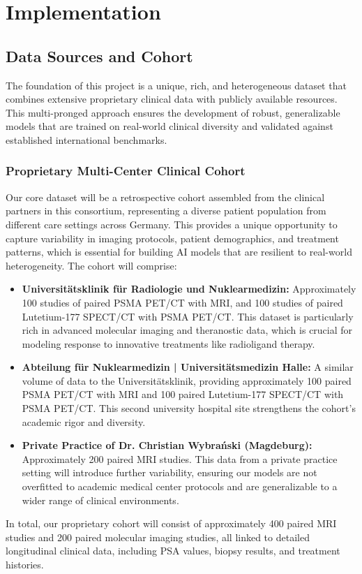\documentclass[11pt, a4paper]{article}
\begin{document}
\section{Implementation}

\subsection{Data Sources and Cohort}
The foundation of this project is a unique, rich, and heterogeneous dataset that combines extensive proprietary clinical data with publicly available resources. This multi-pronged approach ensures the development of robust, generalizable models that are trained on real-world clinical diversity and validated against established international benchmarks.

\subsubsection{Proprietary Multi-Center Clinical Cohort}
Our core dataset will be a retrospective cohort assembled from the clinical partners in this consortium, representing a diverse patient population from different care settings across Germany. This provides a unique opportunity to capture variability in imaging protocols, patient demographics, and treatment patterns, which is essential for building AI models that are resilient to real-world heterogeneity. The cohort will comprise:
\begin{itemize}
    \item \textbf{Universitätsklinik für Radiologie und Nuklearmedizin:} Approximately 100 studies of paired PSMA PET/CT with MRI, and 100 studies of paired Lutetium-177 SPECT/CT with PSMA PET/CT. This dataset is particularly rich in advanced molecular imaging and theranostic data, which is crucial for modeling response to innovative treatments like radioligand therapy.
    \item \textbf{Abteilung für Nuklearmedizin | Universitätsmedizin Halle:} A similar volume of data to the Universitätsklinik, providing approximately 100 paired PSMA PET/CT with MRI and 100 paired Lutetium-177 SPECT/CT with PSMA PET/CT. This second university hospital site strengthens the cohort's academic rigor and diversity.
    \item \textbf{Private Practice of Dr. Christian Wybrański (Magdeburg):} Approximately 200 paired MRI studies. This data from a private practice setting will introduce further variability, ensuring our models are not overfitted to academic medical center protocols and are generalizable to a wider range of clinical environments.
\end{itemize}
In total, our proprietary cohort will consist of approximately 400 paired MRI studies and 200 paired molecular imaging studies, all linked to detailed longitudinal clinical data, including PSA values, biopsy results, and treatment histories.
\end{document}
